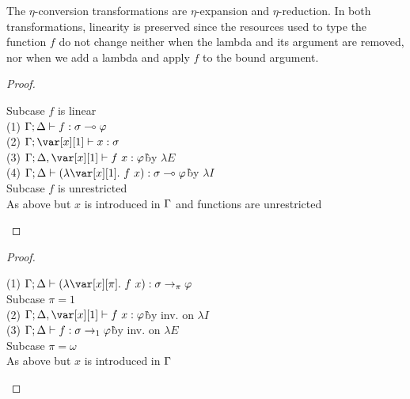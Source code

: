 The $\eta$-conversion transformations are $\eta$-expansion and
$\eta$-reduction. In both transformations, linearity is preserved since the
resources used to type the function $f$ do not change neither when the lambda
and its argument are removed, nor when we add a lambda and apply $f$ to the
bound argument.

\EtaExpansionTheorem

\begin{proof}~
\begin{tabbing}
    Subcase $f$ is linear\\
    (1) $\Gamma; \Delta \vdash f : \sigma \multimap \varphi$\\
    (2) $\G; \xl \vdash x : \s$\\
    (3) $\G; \D, \xl \vdash f~x : \vp$\`by $\lambda E$\\
    (4) $\G; \D \vdash (\lambda \xl.~f~x) : \s \lolli \vp$\`by $\lambda I$\\
    Subcase $f$ is unrestricted\\
    As above but $x$ is introduced in $\Gamma$ and functions are unrestricted
\end{tabbing}
\end{proof}

\EtaReductionTheorem

\begin{proof}~
\begin{tabbing}
    (1) $\G; \D \vdash (\lambda \x[\pi].~f~x) : \s \to_\pi \vp$\\
    Subcase $\pi = 1$\\
    (2) $\G; \D, \xl \vdash f~x : \vp$\`by inv. on $\lambda I$\\
    (3) $\Gamma; \Delta \vdash f : \sigma \to_1 \varphi$\`by inv. on $\lambda E$\\
    Subcase $\pi = \omega$\\
    As above but $x$ is introduced in $\Gamma$
\end{tabbing}
\end{proof}

